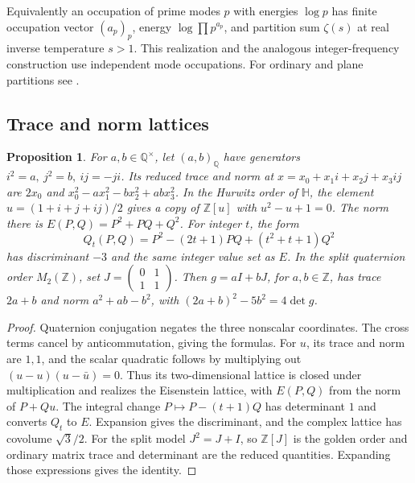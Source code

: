 \documentclass[11pt,reqno]{amsart}
\newtheorem{proposition}[theorem]{Proposition}
\theoremstyle{definition}
\theoremstyle{remark}
\numberwithin{equation}{section}
\newcommand{\HH}{\mathbb{H}}
\newcommand{\Q}{\mathbb{Q}}
\newcommand{\Z}{\mathbb{Z}}
\begin{document}
Equivalently an occupation of prime modes \(p\) with energies
\(\log p\) has finite occupation vector \((a_p)_p\), energy
\(\log\prod p^{a_p}\), and partition sum \(\zeta(s)\) at real
inverse temperature \(s>1\). This realization and the analogous
integer-frequency construction use independent mode occupations.
For ordinary and plane partitions see \cite{m9:HardyRamanujan,m9:MacMahon}.

\subsection{Trace and norm lattices}

\begin{proposition}\label{m9:lattices}
For \(a,b\in\Q^\times\), let \((a,b)_{\Q}\) have generators
\(i^2=a,\ j^2=b,\ ij=-ji\). Its reduced trace and norm at
\(x=x_0+x_1i+x_2j+x_3ij\) are \(2x_0\) and
\(x_0^2-a x_1^2-b x_2^2+abx_3^2\).
In the Hurwitz order of \(\HH\), the element
\(u=(1+i+j+ij)/2\) gives a copy of \(\Z[u]\) with
\(u^2-u+1=0\). The norm there is \(E(P,Q)=P^2+PQ+Q^2\).
For integer \(t\), the form
\[
 Q_t(P,Q)=P^2-(2t+1)PQ+(t^2+t+1)Q^2
\]
has discriminant \(-3\) and the same integer value set as \(E\).
In the split quaternion order \(M_2(\Z)\), set
\(J=\left(\begin{smallmatrix}0&1\\1&1\end{smallmatrix}\right)\).
Then \(g=aI+bJ\), for \(a,b\in\Z\), has trace \(2a+b\) and
norm \(a^2+ab-b^2\), with
\((2a+b)^2-5b^2=4\det g\).
\end{proposition}
\begin{proof}
Quaternion conjugation negates the three nonscalar coordinates.
The cross terms cancel by anticommutation, giving the formulas.
For \(u\), its trace and norm are \(1,1\), and the scalar
quadratic follows by multiplying out
\((u-u)(u-\bar u)=0\). Thus its two-dimensional lattice is
closed under multiplication and realizes the Eisenstein lattice,
with \(E(P,Q)\) from the norm of \(P+Qu\).
The integral change \(P\mapsto P-(t+1)Q\) has determinant \(1\)
and converts \(Q_t\) to \(E\). Expansion gives the discriminant,
and the complex lattice has covolume \(\sqrt3/2\).
For the split model \(J^2=J+I\), so \(\Z[J]\) is the golden order
and ordinary matrix trace and determinant are the reduced
quantities. Expanding those expressions gives the identity.
\end{proof}
\end{document}
